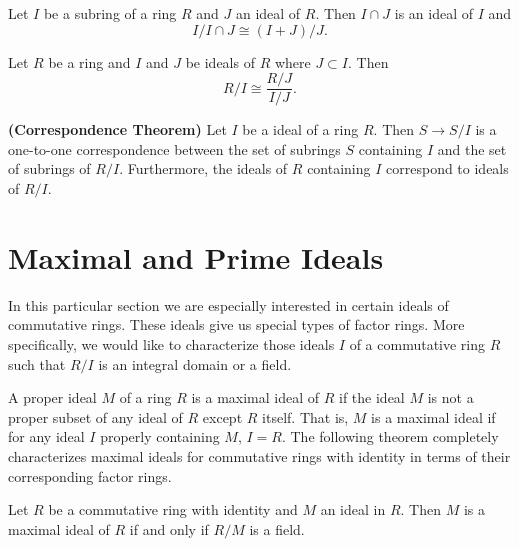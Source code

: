  
\begin{theorem}
Let $I$ be a  subring of a ring $R$  and  $J$ an ideal of $R$.  Then
$I \cap J$ is an ideal of $I$ and 
\[
I / I \cap J \cong (I+ J) /J.
\]
\end{theorem}
 
 
\begin{theorem}
Let $R$ be a ring and $I$ and $J$ be ideals of $R$ where $J \subset
I$.  Then 
\[
R/I \cong \frac{R/J}{I/J}.
\]
\end{theorem}
 
 
\begin{theorem} {\bf (Correspondence Theorem)}
Let $I$ be a ideal of a ring $R$. Then $S \rightarrow S/I$ is a
one-to-one correspondence between the set of subrings $S$ containing
$I$  and the set of subrings of $R/I$. Furthermore, the ideals
of $R$ containing $I$ correspond to ideals of $R/I$. 
\end{theorem}
 
 
 
 
 
\section{Maximal and Prime Ideals}
 
 
In this particular section we are especially interested in certain
ideals of commutative rings. These ideals give us special types of factor
rings. More specifically, we would like to characterize those ideals
$I$ of a commutative ring $R$ such that $R/I$ is an integral domain or
a field.  
 
 
A proper ideal $M$ of a ring $R$ is a {\bfi maximal
ideal\/} of $R$ if the ideal
$M$ is not a proper subset of any ideal of $R$ except $R$ itself.
That is, $M$ is a 
maximal ideal if for any ideal $I$ properly containing $M$, $I = R$.
The following theorem completely characterizes maximal ideals for
commutative rings with identity in terms of their corresponding factor
rings.  
 
 
\begin{theorem}
Let $R$ be a commutative ring with identity and $M$ an ideal in $R$.
Then $M$ is a maximal ideal of $R$ if and only if $R/M$ is a field. 
\end{theorem}
 
